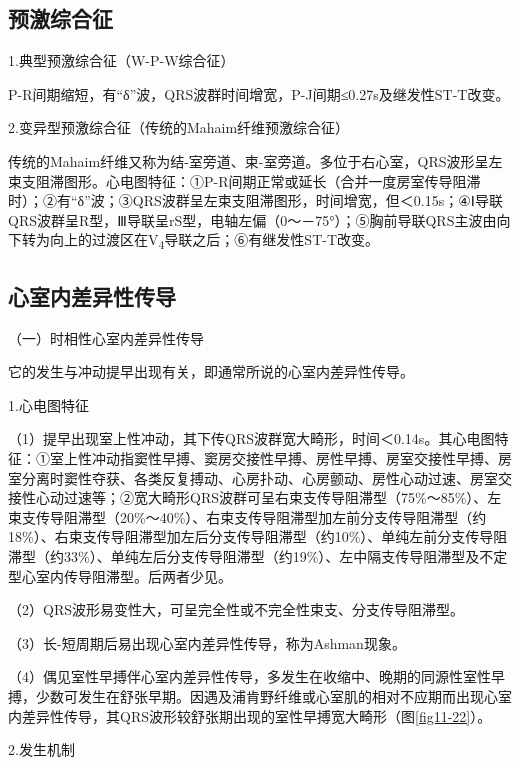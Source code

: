 \protect\hypertarget{text00009.htmlux5cux23subid58}{}{}

\subsection{预激综合征}

1.典型预激综合征（W-P-W综合征）

P-R间期缩短，有“δ”波，QRS波群时间增宽，P-J间期≤0.27s及继发性ST-T改变。

2.变异型预激综合征（传统的Mahaim纤维预激综合征）

传统的Mahaim纤维又称为结-室旁道、束-室旁道。多位于右心室，QRS波形呈左束支阻滞图形。心电图特征：①P-R间期正常或延长（合并一度房室传导阻滞时）；②有“δ”波；③QRS波群呈左束支阻滞图形，时间增宽，但＜0.15s；④Ⅰ导联QRS波群呈R型，Ⅲ导联呈rS型，电轴左偏（0～－75°）；⑤胸前导联QRS主波由向下转为向上的过渡区在V\textsubscript{4}导联之后；⑥有继发性ST-T改变。

\protect\hypertarget{text00009.htmlux5cux23subid59}{}{}

\subsection{心室内差异性传导}

（一）时相性心室内差异性传导

它的发生与冲动提早出现有关，即通常所说的心室内差异性传导。

1.心电图特征

（1）提早出现室上性冲动，其下传QRS波群宽大畸形，时间＜0.14s。其心电图特征：①室上性冲动指窦性早搏、窦房交接性早搏、房性早搏、房室交接性早搏、房室分离时窦性夺获、各类反复搏动、心房扑动、心房颤动、房性心动过速、房室交接性心动过速等；②宽大畸形QRS波群可呈右束支传导阻滞型（75\%～85\%）、左束支传导阻滞型（20\%～40\%）、右束支传导阻滞型加左前分支传导阻滞型（约18\%）、右束支传导阻滞型加左后分支传导阻滞型（约10\%）、单纯左前分支传导阻滞型（约33\%）、单纯左后分支传导阻滞型（约19\%）、左中隔支传导阻滞型及不定型心室内传导阻滞型。后两者少见。

（2）QRS波形易变性大，可呈完全性或不完全性束支、分支传导阻滞型。

（3）长-短周期后易出现心室内差异性传导，称为Ashman现象。

（4）偶见室性早搏伴心室内差异性传导，多发生在收缩中、晚期的同源性室性早搏，少数可发生在舒张早期。因遇及浦肯野纤维或心室肌的相对不应期而出现心室内差异性传导，其QRS波形较舒张期出现的室性早搏宽大畸形（图\ref{fig11-22}）。

2.发生机制

